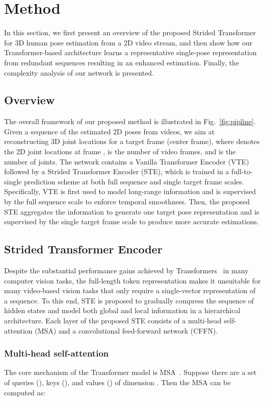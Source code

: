 \documentclass[journal]{IEEEtran}
\begin{document}
\section{Method}
In this section, we first present an overview of the proposed Strided Transformer for 3D human pose estimation from a 2D video stream, and then show how our Transformer-based architecture learns a representative single-pose representation from redundant sequences resulting in an enhanced estimation. 
Finally, the complexity analysis of our network is presented. 

\subsection{Overview}
The overall framework of our proposed method is illustrated in Fig.~\ref{fig:pipline}. 
Given a sequence of the estimated 2D poses
 from videos, we aim at reconstructing 3D joint locations  for a target frame (center frame), where  denotes the 2D joint locations at frame ,  is the number of video frames, and  is the number of joints. 
The network contains a Vanilla Transformer Encoder (VTE) followed by a Strided Transformer Encoder (STE), which is trained in a full-to-single prediction scheme at both full sequence and single target frame scales. 
Specifically, VTE is first used to model long-range information and is supervised by the full sequence scale to enforce temporal smoothness. 
Then, the proposed STE aggregates the information to generate one target pose representation and is supervised by the single target frame scale to produce more accurate estimations.  

\subsection{Strided Transformer Encoder}
\label{sec:STE}
Despite the substantial performance gains achieved by Transformers~\cite{Attention} in many computer vision tasks, the full-length token representation makes it unsuitable for many video-based vision tasks that only require a single-vector representation of a sequence. 
To this end, STE is proposed to gradually compress the sequence of hidden states and model both global and local information in a hierarchical architecture. 
Each layer of the proposed STE consists of a multi-head self-attention (MSA) and a convolutional feed-forward network (CFFN). 

\subsubsection{Multi-head self-attention}
The core mechanism of the Transformer model is MSA~\cite{Attention}. 
Suppose there are a set of queries (), keys (), and values () of dimension . 
Then the MSA can be computed as:
\end{document}
